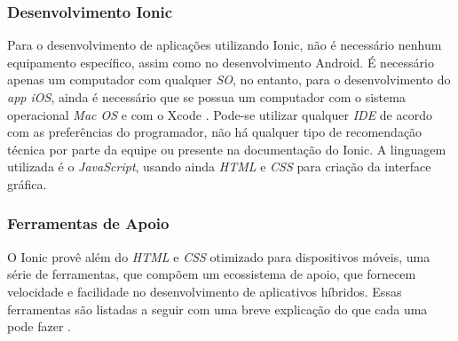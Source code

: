 \subsubsection{Desenvolvimento Ionic} \label{subsubsection:dev-ionic}
Para o desenvolvimento de aplicações utilizando Ionic, não é necessário nenhum equipamento específico, assim como no desenvolvimento Android.
É necessário apenas um computador com qualquer \textit{SO}, no entanto, para o desenvolvimento do \textit{app iOS}, ainda é necessário que se possua um computador com o sistema operacional 
\textit{Mac OS} e com o Xcode \cite{drifty_installing_2016}.
Pode-se utilizar qualquer \textit{IDE} de acordo com as preferências do programador, não há qualquer tipo de recomendação técnica por parte da equipe ou presente na documentação do Ionic.
A linguagem utilizada é o \textit{JavaScript}, usando ainda \textit{HTML} e \textit{CSS} para criação da interface gráfica.

\subsubsection{Ferramentas de Apoio} \label{subsection:ionicferramentasapoio}

O Ionic provê além do \textit{HTML} e \textit{CSS} otimizado para dispositivos móveis, 
uma série de ferramentas, que compõem um ecossistema de apoio, que fornecem velocidade e facilidade no desenvolvimento de aplicativos híbridos. 
Essas ferramentas são listadas a seguir com uma breve explicação do que cada uma pode fazer \cite{drifty_ionic:_2016}.

